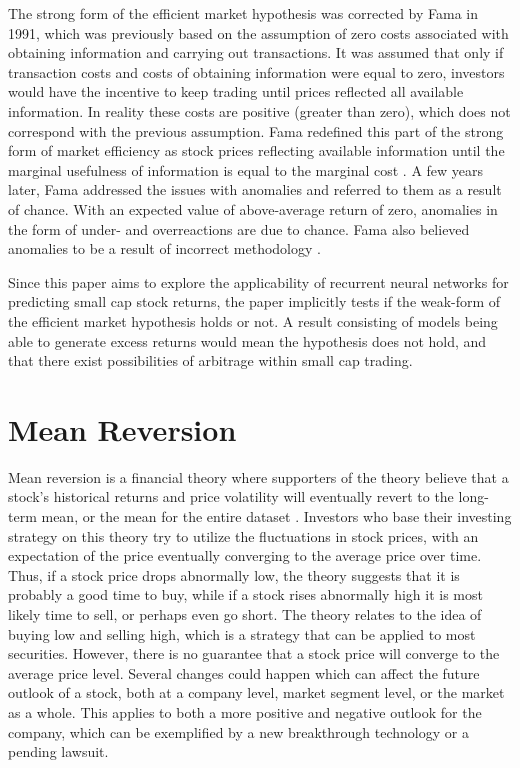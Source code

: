 \indent \newline 
The strong form of the efficient market hypothesis was corrected by Fama in 1991, which was previously based on the assumption of zero costs associated with obtaining information and carrying out transactions. It was assumed that only if transaction costs and costs of obtaining information were equal to zero, investors would have the incentive to keep trading until prices reflected all available information. In reality these costs are positive (greater than zero), which does not correspond with the previous assumption. Fama redefined this part of the strong form of market efficiency as stock prices reflecting available information until the marginal usefulness of information is equal to the marginal cost \cite{lekovic}. A few years later, Fama addressed the issues with anomalies and referred to them as a result of chance. With an expected value of above-average return of zero, anomalies in the form of under- and overreactions are due to chance. Fama also believed anomalies to be a result of incorrect methodology \cite{lekovic}.

\indent \newline 
Since this paper aims to explore the applicability of recurrent neural networks for predicting small cap stock returns, the paper implicitly tests if the weak-form of the efficient market hypothesis holds or not. A result consisting of models being able to generate excess returns would mean the hypothesis does not hold, and that there exist possibilities of arbitrage within small cap trading.    

\section{Mean Reversion}
Mean reversion is a financial theory where supporters of the theory believe that a stock's historical returns and price volatility will eventually revert to the long-term mean, or the mean for the entire dataset \cite{chenj}. Investors who base their investing strategy on this theory try to utilize the fluctuations in stock prices, with an expectation of the price eventually converging to the average price over time. Thus, if a stock price drops abnormally low, the theory suggests that it is probably a good time to buy, while if a stock rises abnormally high it is most likely time to sell, or perhaps even go short. The theory relates to the idea of buying low and selling high, which is a strategy that can be applied to most securities. However, there is no guarantee that a stock price will converge to the average price level. Several changes could happen which can affect the future outlook of a stock, both at a company level, market segment level, or the market as a whole. This applies to both a more positive and negative outlook for the company, which can be exemplified by a new breakthrough technology or a pending lawsuit. 

